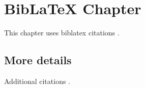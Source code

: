 
\section{BibLaTeX Chapter}

This chapter uses biblatex citations \cite{kitchin-2015-examp}.

\subsection{More details}

Additional citations \cite{author2023}.

